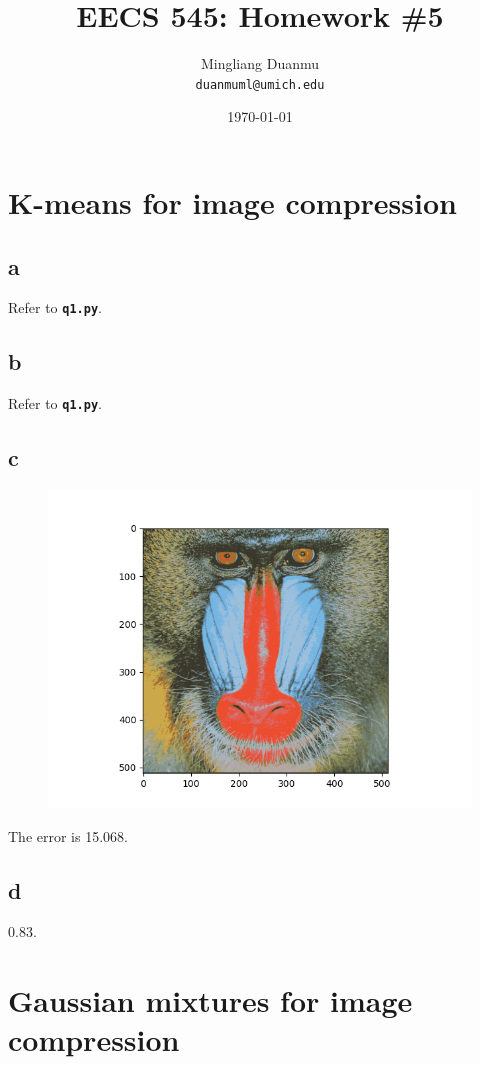 \documentclass{article}
\title{EECS 545: Homework \#5} %
\author{Mingliang Duanmu\\ \texttt{duanmuml@umich.edu}} %
\date{\today} %
\begin{document}
\maketitle %

\section{K-means for image compression}

\subsection*{a}

Refer to \textbf{\texttt{q1.py}}.

\subsection*{b}

Refer to \textbf{\texttt{q1.py}}.

\subsection*{c}

\begin{figure}[htbp]
    \centering
    \includegraphics[width=.6\textwidth]{q1.png}
\end{figure}
The error is 15.068.

\subsection*{d}

0.83.

\newpage

\section{Gaussian mixtures for image compression}
\end{document}
